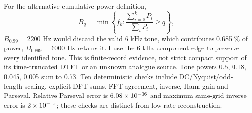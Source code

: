 For the alternative cumulative-power definition,
\begin{equation}
 B_q=\min\left\{f_k:\frac{\sum_{i=0}^{k}P_i}{\sum_iP_i}\ge q\right\},
 \label{eq:energy-bandwidth}
\end{equation}
$ B_{0.99}=2200 $ Hz would discard the valid 6 kHz tone, which contributes
0.685 \% of power; $ B_{0.999}=6000 $ Hz retains it. I use the 6 kHz component
edge to preserve every identified tone. This is finite-record evidence,
not strict compact support of its time-truncated DTFT or an unknown
analogue source. Tone powers 0.5, 0.18, 0.045, 0.005 sum to 0.73.
Ten deterministic checks include DC/Nyquist/odd-length scaling, explicit
DFT sums, FFT agreement, inverse, Hann gain and Parseval. Relative
Parseval error is $6.08\times10^{-16} $ and maximum same-grid inverse error
is $2\times10^{-15} $; these checks are distinct from low-rate reconstruction.
